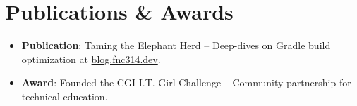\documentclass[11pt,a4paper,sans]{moderncv}
\begin{document}
\section{Publications \& Awards}
\vspace{1pt}
\begin{itemize}
\item \textbf{\rmfamily Publication}: Taming the Elephant Herd -- Deep-dives on Gradle build optimization at \href{https://blog.fnc314.dev}{blog.fnc314.dev}.
\item \textbf{\rmfamily Award}: Founded the CGI I.T. Girl Challenge -- Community partnership for technical education.
\end{itemize}
\end{document}
